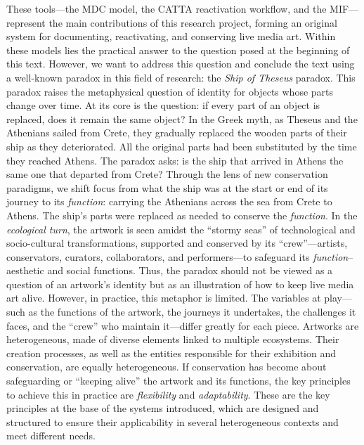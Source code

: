 These tools—the MDC model, the CATTA reactivation workflow, and the MIF—represent the main contributions of this research project, forming an original system for documenting, reactivating, and conserving live media art. Within these models lies the practical answer to the question posed at the beginning of this text. However, we want to address this question and conclude the text using a well-known paradox in this field of research: the \textit{Ship of Theseus} paradox. This paradox raises the metaphysical question of identity for objects whose parts change over time. At its core is the question: if every part of an object is replaced, does it remain the same object? In the Greek myth, as Theseus and the Athenians sailed from Crete, they gradually replaced the wooden parts of their ship as they deteriorated. All the original parts had been substituted by the time they reached Athens. The paradox asks: is the ship that arrived in Athens the same one that departed from Crete? Through the lens of new conservation paradigms, we shift focus from what the ship was at the start or end of its journey to its \textit{function}: carrying the Athenians across the sea from Crete to Athens. The ship’s parts were replaced as needed to conserve the \textit{function}. In the \textit{ecological turn}, the artwork is seen amidst the ``stormy seas'' of technological and socio-cultural transformations, supported and conserved by its ``crew''—artists, conservators, curators, collaborators, and performers—to safeguard its \textit{function}–aesthetic and social functions. Thus, the paradox should not be viewed as a question of an artwork’s identity but as an illustration of how to keep live media art alive. However, in practice, this metaphor is limited. The variables at play—such as the functions of the artwork, the journeys it undertakes, the challenges it faces, and the ``crew'' who maintain it—differ greatly for each piece. Artworks are heterogeneous, made of diverse elements linked to multiple ecosystems. Their creation processes, as well as the entities responsible for their exhibition and conservation, are equally heterogeneous. If conservation has become about safeguarding or ``keeping alive'' the artwork and its functions, the key principles to achieve this in practice are \textit{flexibility} and \textit{adaptability}. These are the key principles at the base of the systems introduced, which are designed and structured to ensure their applicability in several heterogeneous contexts and meet different needs. 











